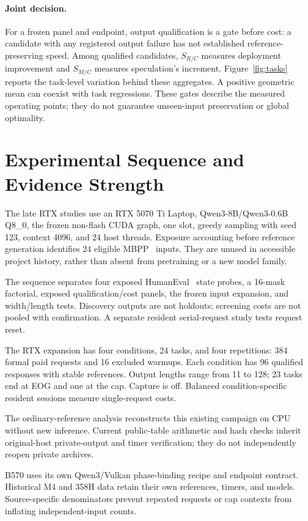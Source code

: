 \documentclass{article}
\begin{document}
\paragraph{Joint decision.}
For a frozen panel and endpoint, output qualification is a gate before cost: a candidate with any registered output failure has not established reference-preserving speed. Among qualified candidates, $S_{R/C}$ measures deployment improvement and $S_{M/C}$ measures speculation's increment. Figure~\ref{fig:tasks} reports the task-level variation behind these aggregates. A positive geometric mean can coexist with task regressions. These gates describe the measured operating points; they do not guarantee unseen-input preservation or global optimality.

\section{Experimental Sequence and Evidence Strength}
The late RTX studies use an RTX 5070 Ti Laptop, Qwen3-8B/Qwen3-0.6B Q8\_0, the frozen non-flash CUDA graph, one slot, greedy sampling with seed 123, context 4096, and 24 host threads. Exposure accounting before reference generation identifies 24 eligible MBPP~\cite{mbpp} inputs. They are unused in accessible project history, rather than absent from pretraining or a new model family.

The sequence separates four exposed HumanEval~\cite{humaneval} state probes, a 16-mask factorial, exposed qualification/cost panels, the frozen input expansion, and width/length tests. Discovery outputs are not holdouts; screening costs are not pooled with confirmation. A separate resident serial-request study tests request reset.

The RTX expansion has four conditions, 24 tasks, and four repetitions: 384 formal paid requests and 16 excluded warmups. Each condition has 96 qualified responses with stable references. Output lengths range from 11 to 128; 23 tasks end at EOG and one at the cap. Capture is off. Balanced condition-specific resident sessions measure single-request costs.

The ordinary-reference analysis reconstructs this existing campaign on CPU without new inference. Current public-table arithmetic and hash checks inherit original-host private-output and timer verification; they do not independently reopen private archives.

B570 uses its own Qwen3/Vulkan phase-binding recipe and endpoint contract. Historical M4 and 358H data retain their own references, timers, and models. Source-specific denominators prevent repeated requests or cap contexts from inflating independent-input counts.
\end{document}
